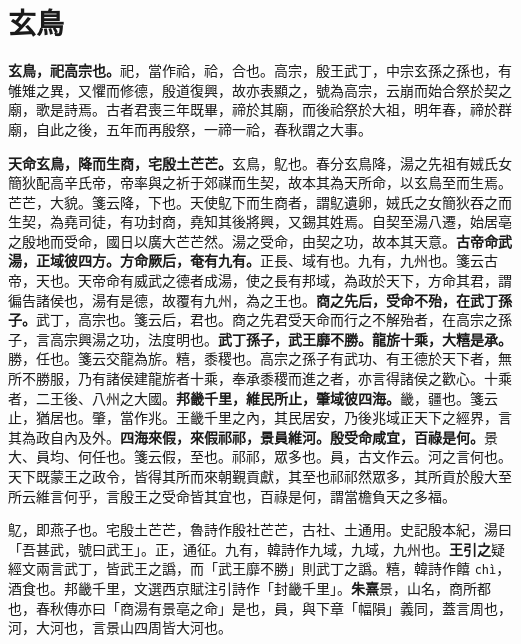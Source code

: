 \section{玄鳥}


\textbf{玄鳥，祀高宗也。}{\footnotesize 祀，當作祫，祫，合也。高宗，殷王武丁，中宗玄孫之孫也，有雊雉之異，又懼而修德，殷道復興，故亦表顯之，號為高宗，云崩而始合祭於契之廟，歌是詩焉。古者君喪三年既畢，禘於其廟，而後祫祭於大祖，明年春，禘於群廟，自此之後，五年而再殷祭，一禘一祫，春秋謂之大事。}

\textbf{天命玄鳥，降而生商，宅殷土芒芒。}{\footnotesize 玄鳥，鳦也。春分玄鳥降，湯之先祖有娀氏女簡狄配高辛氏帝，帝率與之祈于郊禖而生契，故本其為天所命，以玄鳥至而生焉。芒芒，大貌。箋云降，下也。天使鳦下而生商者，謂鳦遺卵，娀氏之女簡狄吞之而生契，為堯司徒，有功封商，堯知其後將興，又錫其姓焉。自契至湯八遷，始居亳之殷地而受命，國日以廣大芒芒然。湯之受命，由契之功，故本其天意。}\textbf{古帝命武湯，正域彼四方。方命厥后，奄有九有。}{\footnotesize 正長、域有也。九有，九州也。箋云古帝，天也。天帝命有威武之德者成湯，使之長有邦域，為政於天下，方命其君，謂徧告諸侯也，湯有是德，故覆有九州，為之王也。}\textbf{商之先后，受命不殆，在武丁孫子。}{\footnotesize 武丁，高宗也。箋云后，君也。商之先君受天命而行之不解殆者，在高宗之孫子，言高宗興湯之功，法度明也。}\textbf{武丁孫子，武王靡不勝。龍旂十乘，大糦是承。}{\footnotesize 勝，任也。箋云交龍為旂。糦，黍稷也。高宗之孫子有武功、有王德於天下者，無所不勝服，乃有諸侯建龍旂者十乘，奉承黍稷而進之者，亦言得諸侯之歡心。十乘者，二王後、八州之大國。}\textbf{邦畿千里，維民所止，肇域彼四海。}{\footnotesize 畿，疆也。箋云止，猶居也。肇，當作兆。王畿千里之內，其民居安，乃後兆域正天下之經界，言其為政自內及外。}\textbf{四海來假，來假祁祁，景員維河。殷受命咸宜，百祿是何。}{\footnotesize 景大、員均、何任也。箋云假，至也。祁祁，眾多也。員，古文作云。河之言何也。天下既蒙王之政令，皆得其所而來朝覲貢獻，其至也祁祁然眾多，其所貢於殷大至所云維言何乎，言殷王之受命皆其宜也，百祿是何，謂當檐負天之多福。}

\begin{quoting}鳦，即燕子也。宅殷土芒芒，魯詩作殷社芒芒，古社、土通用。史記殷本紀，湯曰「吾甚武，號曰武王」。正，通征。九有，韓詩作九域，九域，九州也。\textbf{王引之}疑經文兩言武丁，皆武王之譌，而「武王靡不勝」則武丁之譌。糦，韓詩作饎 \texttt{chì}，酒食也。邦畿千里，文選西京賦注引詩作「封畿千里」。\textbf{朱熹}景，山名，商所都也，春秋傳亦曰「商湯有景亳之命」是也，員，與下章「幅隕」義同，蓋言周也，河，大河也，言景山四周皆大河也。\end{quoting}

